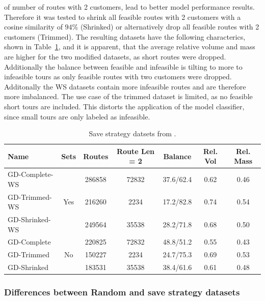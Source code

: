 of number of routes with 2 customers, lead to better model performance results. Therefore it was tested
to shrink all feasible routes with 2 customers with a cosine similarity of $94\%$ (Shrinked) or alternatively drop
all feasible routes with 2 customers (Trimmed).
The resulting datasets have the following characterics, shown in Table~\ref{tab:saved_instances_gendreau}, and it is apparent, that the average relative volume
and mass are higher for the two modified datasets, as short routes were dropped. Additionally the balance between
feasible and infeasible is tilting to more to infeasible tours as only feasible routes with two customers were dropped.
Additonally the WS datasets contain more infeasible routes and are therefore more imbalanced. The use case of the trimmed dataset is limited,
as no feasible short tours are included. This distorts the application of the model classifier, since small tours are only labeled as infeasible.

\begin{table}[!h]
    \centering
    \small
    \begin{tabular}{l c c c c c c }
        \toprule
        Name           & Sets                 & Routes & Route Len = 2 & Balance   & Rel. Vol & Rel. Mass \\
        \midrule
        GD-Complete-WS & \multirow{3}{*}{Yes} & 286858 & 72832         & 37.6/62.4 & 0.62     & 0.46      \\
        GD-Trimmed-WS  &                      & 216260 & 2234          & 17.2/82.8 & 0.74     & 0.54      \\
        GD-Shrinked-WS &                      & 249564 & 35538         & 28.2/71.8 & 0.68     & 0.50      \\        \midrule
        GD-Complete    & \multirow{3}{*}{No}  & 220825 & 72832         & 48.8/51.2 & 0.55     & 0.43      \\
        GD-Trimmed     &                      & 150227 & 2234          & 24.7/75.3 & 0.69     & 0.53      \\
        GD-Shrinked    &                      & 183531 & 35538         & 38.4/61.6 & 0.61     & 0.48      \\
        \bottomrule
    \end{tabular}
    \caption[Save strategy train datsets from \gendreauDataSet.]{Save strategy datsets from \gendreauDataSet.}
    \label{tab:saved_instances_gendreau}
\end{table}

\subsubsection{Differences between Random and save strategy datasets}

